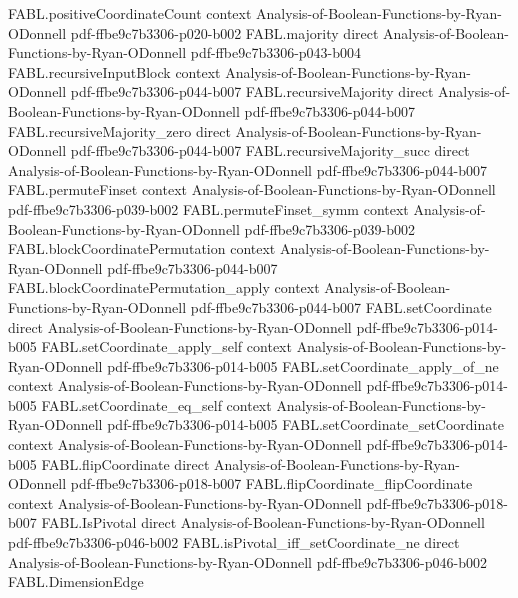 \begin{theorem}
\proofstep
  {FABL.positiveCoordinateCount}
  {context}
  {Analysis-of-Boolean-Functions-by-Ryan-ODonnell}
  {pdf-ffbe9c7b3306-p020-b002}
\proofstep
  {FABL.majority}
  {direct}
  {Analysis-of-Boolean-Functions-by-Ryan-ODonnell}
  {pdf-ffbe9c7b3306-p043-b004}
\proofstep
  {FABL.recursiveInputBlock}
  {context}
  {Analysis-of-Boolean-Functions-by-Ryan-ODonnell}
  {pdf-ffbe9c7b3306-p044-b007}
\proofstep
  {FABL.recursiveMajority}
  {direct}
  {Analysis-of-Boolean-Functions-by-Ryan-ODonnell}
  {pdf-ffbe9c7b3306-p044-b007}
\proofstep
  {FABL.recursiveMajority_zero}
  {direct}
  {Analysis-of-Boolean-Functions-by-Ryan-ODonnell}
  {pdf-ffbe9c7b3306-p044-b007}
\proofstep
  {FABL.recursiveMajority_succ}
  {direct}
  {Analysis-of-Boolean-Functions-by-Ryan-ODonnell}
  {pdf-ffbe9c7b3306-p044-b007}
\proofstep
  {FABL.permuteFinset}
  {context}
  {Analysis-of-Boolean-Functions-by-Ryan-ODonnell}
  {pdf-ffbe9c7b3306-p039-b002}
\proofstep
  {FABL.permuteFinset_symm}
  {context}
  {Analysis-of-Boolean-Functions-by-Ryan-ODonnell}
  {pdf-ffbe9c7b3306-p039-b002}
\proofstep
  {FABL.blockCoordinatePermutation}
  {context}
  {Analysis-of-Boolean-Functions-by-Ryan-ODonnell}
  {pdf-ffbe9c7b3306-p044-b007}
\proofstep
  {FABL.blockCoordinatePermutation_apply}
  {context}
  {Analysis-of-Boolean-Functions-by-Ryan-ODonnell}
  {pdf-ffbe9c7b3306-p044-b007}
\proofstep
  {FABL.setCoordinate}
  {direct}
  {Analysis-of-Boolean-Functions-by-Ryan-ODonnell}
  {pdf-ffbe9c7b3306-p014-b005}
\proofstep
  {FABL.setCoordinate_apply_self}
  {context}
  {Analysis-of-Boolean-Functions-by-Ryan-ODonnell}
  {pdf-ffbe9c7b3306-p014-b005}
\proofstep
  {FABL.setCoordinate_apply_of_ne}
  {context}
  {Analysis-of-Boolean-Functions-by-Ryan-ODonnell}
  {pdf-ffbe9c7b3306-p014-b005}
\proofstep
  {FABL.setCoordinate_eq_self}
  {context}
  {Analysis-of-Boolean-Functions-by-Ryan-ODonnell}
  {pdf-ffbe9c7b3306-p014-b005}
\proofstep
  {FABL.setCoordinate_setCoordinate}
  {context}
  {Analysis-of-Boolean-Functions-by-Ryan-ODonnell}
  {pdf-ffbe9c7b3306-p014-b005}
\proofstep
  {FABL.flipCoordinate}
  {direct}
  {Analysis-of-Boolean-Functions-by-Ryan-ODonnell}
  {pdf-ffbe9c7b3306-p018-b007}
\proofstep
  {FABL.flipCoordinate_flipCoordinate}
  {context}
  {Analysis-of-Boolean-Functions-by-Ryan-ODonnell}
  {pdf-ffbe9c7b3306-p018-b007}
\proofstep
  {FABL.IsPivotal}
  {direct}
  {Analysis-of-Boolean-Functions-by-Ryan-ODonnell}
  {pdf-ffbe9c7b3306-p046-b002}
\proofstep
  {FABL.isPivotal_iff_setCoordinate_ne}
  {direct}
  {Analysis-of-Boolean-Functions-by-Ryan-ODonnell}
  {pdf-ffbe9c7b3306-p046-b002}
\proofstep
  {FABL.DimensionEdge}

\end{theorem}
